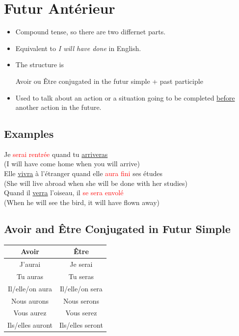 \documentclass{book}
\begin{document}
\chapter{Futur Antérieur}
    \begin{itemize}
        \item Compound tense, so there are two differnet parts.
        \item Equivalent to \textit{I will have done} in English.
        \item The structure is
            \begin{center}
                Avoir ou Être conjugated in the futur simple + past participle
            \end{center}
        \item Used to talk about an action or a situation going to be completed \underline{before} another action in the future.
    \end{itemize}

    \section{Examples}
        \begin{center}
            Je \textcolor{red}{serai rentrée} quand tu \underline{arriveras} \\
            (I will have come home when you will arrive) \\
            Elle \underline{vivra} à l'étranger quand elle \textcolor{red}{aura fini} ses études \\
            (She will live abroad when she will be done with her studies) \\
            Quand il \underline{verra} l'oiseau, il \textcolor{red}{se sera envolé} \\
            (When he will see the bird, it will have flown away)
        \end{center}

    \section{Avoir and Être Conjugated in Futur Simple}
        \begin{center}
            \begin{tabular}{|c|c|}
                \hline
                \textbf{Avoir} & \textbf{Être} \\
                \hline
                J'aurai & Je serai \\
                \hline
                Tu auras & Tu seras \\
                \hline
                Il/elle/on aura & Il/elle/on sera \\
                \hline
                Nous aurons & Nous serons \\
                \hline
                Vous aurez & Vous serez \\
                \hline
                Ils/elles auront & Ils/elles seront \\
                \hline
            \end{tabular}
        \end{center}
\end{document}
